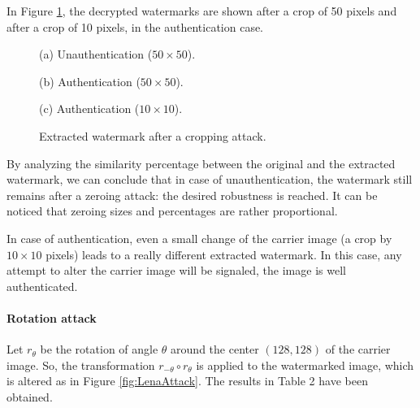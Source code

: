 \documentclass[journal]{IEEEtran}
\begin{document}
In Figure \ref{fig:Dechiffrement_invader}, the decrypted watermarks are shown after a crop of 50 pixels and after a crop of 10 pixels, in the authentication case.

\begin{figure}[htb]
\begin{minipage}[b]{1.0\linewidth}
  \centering
 \centerline{}
  \centerline{(a) Unauthentication ($50\times 50$).}
\end{minipage}
\begin{minipage}[b]{.48\linewidth}
  \centering
 \centerline{}
  \centerline{(b) Authentication  ($50\times 50$).}
\end{minipage}
\hfill
\begin{minipage}[b]{0.48\linewidth}
  \centering
 \centerline{}
  \centerline{(c) Authentication  ($10\times 10$).}
\end{minipage}
\caption{Extracted watermark after a cropping attack.}
\label{fig:Dechiffrement_invader}
\end{figure}


By analyzing the similarity percentage between the original and the
extracted watermark, we can conclude that in case of unauthentication, the
watermark still remains after a zeroing attack: the desired robustness is
reached. It can be noticed that zeroing sizes and percentages are rather
proportional.

In case of authentication, even a small change of the carrier image (a crop
by $10\times 10$ pixels) leads to a really different extracted watermark.
In this case, any attempt to alter the carrier image will be signaled, the
image is well authenticated.

\paragraph{Rotation attack}

Let $r_{\theta }$ be the rotation of angle $\theta $ around the center $(128, 128)$ of the carrier image. So, the transformation $r_{-\theta }\circ
r_{\theta }$ is applied to the watermarked image, which is altered as in Figure \ref{fig:LenaAttack}. The results in Table 2 have been obtained.
\end{document}
